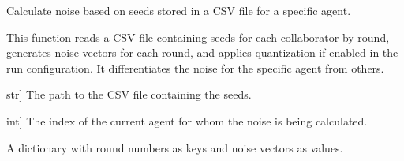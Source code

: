 \documentclass[letterpaper,10pt,english]{sphinxmanual}
\begin{document}
\begin{fulllineitems}
\label{\detokenize{utils_smpc:utils_smpc.calc_noise}}
\pysigstartsignatures
{}
\pysigstopsignatures
\sphinxAtStartPar
Calculate noise based on seeds stored in a CSV file for a specific agent.

\sphinxAtStartPar
This function reads a CSV file containing seeds for each collaborator by round,
generates noise vectors for each round, and applies quantization if enabled in 
the run configuration. It differentiates the noise for the specific agent from others.
\begin{description}
\begin{description}
\sphinxlineitem{file\_path}{[}str{]}
\sphinxAtStartPar
The path to the CSV file containing the seeds.

\sphinxlineitem{agent\_number}{[}int{]}
\sphinxAtStartPar
The index of the current agent for whom the noise is being calculated.

\end{description}

\begin{description}
\sphinxAtStartPar
A dictionary with round numbers as keys and noise vectors as values.

\end{description}

\begin{sphinxVerbatim}[commandchars=\\\{\}]
   
\PYG{p}{[}\PYG{p}{]}  
\end{sphinxVerbatim}

\end{description}

\end{fulllineitems}
\end{document}
